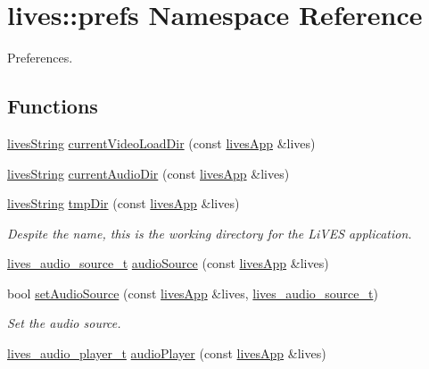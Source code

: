\hypertarget{namespacelives_1_1prefs}{\section{lives\-:\-:prefs Namespace Reference}
\label{namespacelives_1_1prefs}
}


Preferences.  


\subsection*{Functions}
\begin{DoxyCompactItemize}
\item 
\hyperlink{classlives_1_1livesString}{lives\-String} \hyperlink{namespacelives_1_1prefs_a8a5cb486bc86e992b76af3580c6bf181}{current\-Video\-Load\-Dir} (const \hyperlink{classlives_1_1livesApp}{lives\-App} \&lives)
\item 
\hyperlink{classlives_1_1livesString}{lives\-String} \hyperlink{namespacelives_1_1prefs_a42feaa9ad0c621aa8706a4658c6e7c48}{current\-Audio\-Dir} (const \hyperlink{classlives_1_1livesApp}{lives\-App} \&lives)
\item 
\hyperlink{classlives_1_1livesString}{lives\-String} \hyperlink{namespacelives_1_1prefs_aeb5550c8f3266f6d3bffeb40e8389d60}{tmp\-Dir} (const \hyperlink{classlives_1_1livesApp}{lives\-App} \&lives)
\begin{DoxyCompactList}\small\item\em Despite the name, this is the working directory for the Li\-V\-E\-S application. \end{DoxyCompactList}\item 
\hyperlink{liblives_8hpp_ad6a0fc86b58b6ddc9e37d7375107ca5e}{lives\-\_\-audio\-\_\-source\-\_\-t} \hyperlink{namespacelives_1_1prefs_a380b01381790ad43770e134d35980e35}{audio\-Source} (const \hyperlink{classlives_1_1livesApp}{lives\-App} \&lives)
\item 
bool \hyperlink{namespacelives_1_1prefs_a73bc9032d8864ddebb0e26a96839dfaa}{set\-Audio\-Source} (const \hyperlink{classlives_1_1livesApp}{lives\-App} \&lives, \hyperlink{liblives_8hpp_ad6a0fc86b58b6ddc9e37d7375107ca5e}{lives\-\_\-audio\-\_\-source\-\_\-t})
\begin{DoxyCompactList}\small\item\em Set the audio source. \end{DoxyCompactList}\item 
\hyperlink{liblives_8hpp_a52acbff46461d04771fba866edd01139}{lives\-\_\-audio\-\_\-player\-\_\-t} \hyperlink{namespacelives_1_1prefs_a4555839976526ff8e37135d098fafd50}{audio\-Player} (const \hyperlink{classlives_1_1livesApp}{lives\-App} \&lives)

\end{DoxyCompactItemize}
